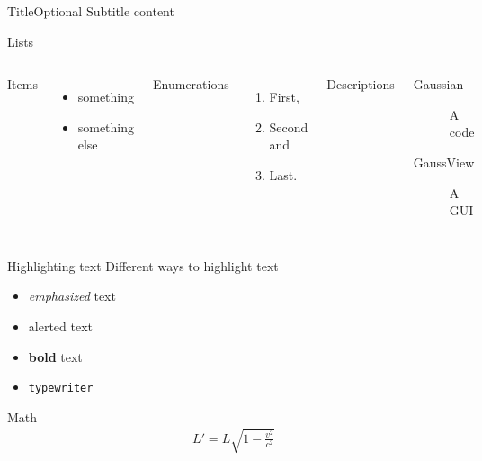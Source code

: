 \documentclass[xcolor={dvipsnames},10pt]{beamer}
\subtitle{Tutorial day X}
\author{Your~name}
\begin{document}
\begin{frame}
    \titlepage
\end{frame}

\begin{frame}{Title}{Optional Subtitle}
    content
\end{frame}

\begin{frame}{Lists}
    \begin{columns}[T,onlytextwidth]
        Items
        \begin{itemize}
            \item something \item something else
        \end{itemize}

        Enumerations
        \begin{enumerate}
            \item First, \item Second and \item Last.
        \end{enumerate}

        Descriptions
        \begin{description}
            \item[Gaussian] A code \item[GaussView] A GUI
        \end{description}
    \end{columns}
\end{frame}


\begin{frame}{Highlighting text}
    Different ways to highlight text
    \begin{itemize}
        \item
            \emph{emphasized} text
        \item
            \alert{alerted} text
        \item
            \textbf{bold} text
        \item
            \texttt{typewriter}
    \end{itemize}
\end{frame}

\begin{frame}{Math}
    \begin{align*}
        L' = {L}{\sqrt{1-\frac{v^2}{c^2}}}
    \end{align*}
\end{frame}
\end{document}
